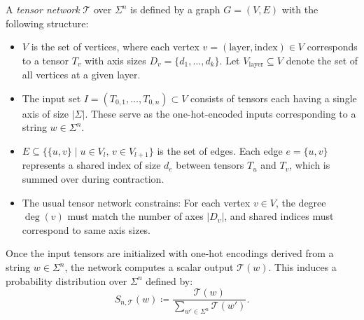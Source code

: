 \documentclass[../../main.tex]{subfiles}
\begin{document}
    \begin{definition}
    A \emph{tensor network} \( \mathcal{T} \) over \( \Sigma^n \) is defined by a graph \( G = (V, E) \) with the following structure:
    \begin{itemize}
        \item \( V \) is the set of vertices, where each vertex \( v = (\text{layer}, \text{index}) \in V \) corresponds to a tensor \( T_v \) with axis sizes \( D_v = \{d_1, \dots, d_k\} \). Let \( V_{\text{layer}} \subseteq V \) denote the set of all vertices at a given layer.
        
        \item The input set \( I = (T_{0,1}, \dots, T_{0,n}) \subset V \) consists of tensors each having a single axis of size \( |\Sigma| \). These serve as the one-hot-encoded inputs corresponding to a string \( w \in \Sigma^n \).
        
        \item \( E \subseteq \{\{u, v\} \mid u \in V_l,\, v \in V_{l+1}\} \) is the set of edges. Each edge \( e = \{u, v\} \) represents a shared index of size \( d_e \) between tensors \( T_u \) and \( T_v \), which is summed over during contraction.
        
        \item The usual tensor network constrains: For each vertex \( v \in V \), the degree \( \deg(v) \) must match the number of axes \( |D_v| \), and shared indices must correspond to same axis sizes.
    \end{itemize}

    Once the input tensors are initialized with one-hot encodings derived from a string \( w \in \Sigma^n \), the network computes a scalar output \( \mathcal{T}(w) \). This induces a probability distribution over \( \Sigma^n \) defined by:
    \[
    S_{n, \mathcal{T}}(w) \coloneqq \frac{\mathcal{T}(w)}{\sum_{w' \in \Sigma^n} \mathcal{T}(w')}.
    \]
    \end{definition}
\end{document}
